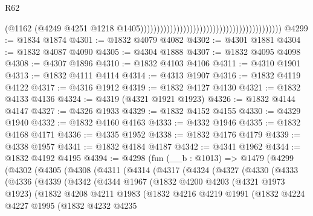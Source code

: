 \begin{lexlean}{R62}
\begin{coremodule}
                                                                                      (@1162
                                                                                        (@4249
                                                                                          @4251
                                                                                          @1218
                                                                                          @1405)))))))))))))))))))))))))))))))))))))))))))
@4299 := @1834 @1874
@4301 := @1832 @4079 @4082
@4302 := @4301 @1881
@4304 := @1832 @4087 @4090
@4305 := @4304 @1888
@4307 := @1832 @4095 @4098
@4308 := @4307 @1896
@4310 := @1832 @4103 @4106
@4311 := @4310 @1901
@4313 := @1832 @4111 @4114
@4314 := @4313 @1907
@4316 := @1832 @4119 @4122
@4317 := @4316 @1912
@4319 := @1832 @4127 @4130
@4321 := @1832 @4133 @4136
@4324 := @4319 (@4321 @1921 @1923)
@4326 := @1832 @4144 @4147
@4327 := @4326 @1933
@4329 := @1832 @4152 @4155
@4330 := @4329 @1940
@4332 := @1832 @4160 @4163
@4333 := @4332 @1946
@4335 := @1832 @4168 @4171
@4336 := @4335 @1952
@4338 := @1832 @4176 @4179
@4339 := @4338 @1957
@4341 := @1832 @4184 @4187
@4342 := @4341 @1962
@4344 := @1832 @4192 @4195
@4394 := @4298
    (fun (__b : @1013) =>
    @1479
      (@4299
        (@4302
          (@4305
            (@4308
              (@4311
                (@4314
                  (@4317
                    (@4324
                      (@4327
                        (@4330
                          (@4333
                            (@4336
                              (@4339
                                (@4342
                                  (@4344
                                    @1967
                                    (@1832
                                      @4200
                                      @4203
                                      (@4321 @1973 @1923)
                                      (@1832
                                        @4208
                                        @4211
                                        @1983
                                        (@1832
                                          @4216
                                          @4219
                                          @1991
                                          (@1832
                                            @4224
                                            @4227
                                            @1995
                                            (@1832
                                              @4232
                                              @4235

\end{coremodule}
\end{lexlean}
